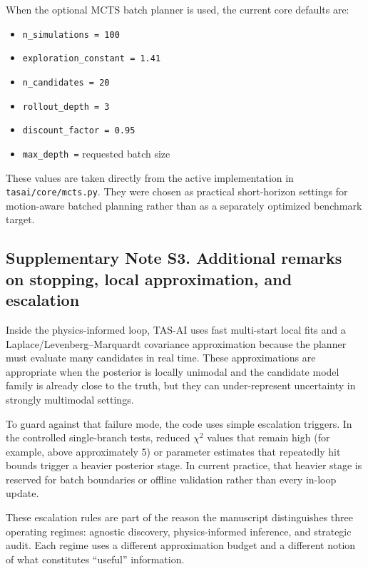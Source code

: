\documentclass[
]{article}
\providecommand{\tightlist}{%
  \setlength{\itemsep}{0pt}\setlength{\parskip}{0pt}}
\begin{document}
When the optional MCTS batch planner is used, the current core defaults
are:

\begin{itemize}
\tightlist
\item
  \texttt{n\_simulations\ =\ 100}
\item
  \texttt{exploration\_constant\ =\ 1.41}
\item
  \texttt{n\_candidates\ =\ 20}
\item
  \texttt{rollout\_depth\ =\ 3}
\item
  \texttt{discount\_factor\ =\ 0.95}
\item
  \texttt{max\_depth\ =} requested batch size
\end{itemize}

These values are taken directly from the active implementation in
\texttt{tasai/core/mcts.py}. They were chosen as practical short-horizon
settings for motion-aware batched planning rather than as a separately
optimized benchmark target.

\hypertarget{supplementary-note-s3.-additional-remarks-on-stopping-local-approximation-and-escalation}{%
\subsection{Supplementary Note S3. Additional remarks on stopping, local
approximation, and
escalation}\label{supplementary-note-s3.-additional-remarks-on-stopping-local-approximation-and-escalation}}

Inside the physics-informed loop, TAS-AI uses fast multi-start local
fits and a Laplace/Levenberg--Marquardt covariance approximation because
the planner must evaluate many candidates in real time. These
approximations are appropriate when the posterior is locally unimodal
and the candidate model family is already close to the truth, but they
can under-represent uncertainty in strongly multimodal settings.

To guard against that failure mode, the code uses simple escalation
triggers. In the controlled single-branch tests, reduced \(\chi^2\)
values that remain high (for example, above approximately 5) or
parameter estimates that repeatedly hit bounds trigger a heavier
posterior stage. In current practice, that heavier stage is reserved for
batch boundaries or offline validation rather than every in-loop update.

These escalation rules are part of the reason the manuscript
distinguishes three operating regimes: agnostic discovery,
physics-informed inference, and strategic audit. Each regime uses a
different approximation budget and a different notion of what
constitutes ``useful'' information.
\end{document}
